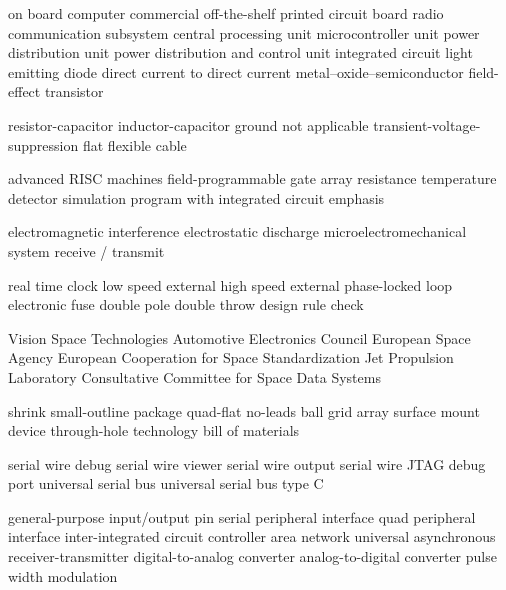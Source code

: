      {on board computer}
    {commercial off-the-shelf}
     {printed circuit board}
     {radio communication subsystem}
     {central processing unit}
     {microcontroller unit}
     {power distribution unit}
    {power distribution and control unit}
      {integrated circuit}
     {light emitting diode}
    {direct current to direct current}
  {metal–oxide–semiconductor field-effect transistor}

      {resistor-capacitor}
      {inductor-capacitor}
     {ground}
      {not applicable}
     {transient-voltage-suppression}
     {flat flexible cable}

     {advanced RISC machines}
    {field-programmable gate array}
     {resistance temperature detector}
   {simulation program with integrated circuit emphasis}

     {electromagnetic interference}
     {electrostatic discharge}
    {microelectromechanical system}
   {receive / transmit}

     {real time clock}
     {low speed external}
     {high speed external}
     {phase-locked loop}
   {electronic fuse}
    {double pole double throw}
     {design rule check}

     {Vision Space Technologies}
     {Automotive Electronics Council}
     {European Space Agency}
   {European Cooperation for Space Standardization}
     {Jet Propulsion Laboratory}
   {Consultative Committee for Space Data Systems}

    {shrink small-outline package}
     {quad-flat no-leads}
     {ball grid array}
     {surface mount device}
     {through-hole technology}
     {bill of materials}

     {serial wire debug}
     {serial wire viewer}
     {serial wire output}
  {serial wire JTAG debug port}
     {universal serial bus}
   {universal serial bus type C}

    {general-purpose input/output pin}
     {serial peripheral interface}
     {quad peripheral interface}
     {inter-integrated circuit}
     {controller area network}
    {universal asynchronous receiver-transmitter}
     {digital-to-analog converter}
     {analog-to-digital converter}
     {pulse width modulation}
